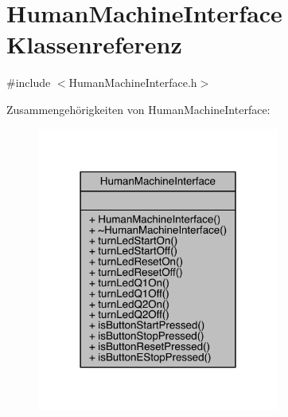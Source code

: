 \hypertarget{class_human_machine_interface}{}\section{Human\+Machine\+Interface Klassenreferenz}
\label{class_human_machine_interface}


{\ttfamily \#include $<$Human\+Machine\+Interface.\+h$>$}



Zusammengehörigkeiten von Human\+Machine\+Interface\+:\nopagebreak
\begin{figure}[H]
\begin{center}
\leavevmode
\includegraphics[width=226pt]{class_human_machine_interface__coll__graph}
\end{center}
\end{figure}
